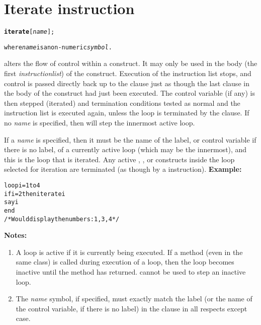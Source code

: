 \chapter{Iterate instruction}
\index{,}
\begin{shaded}
\begin{alltt}
\textbf{iterate} [\emph{name}];

where \emph{name} is a non-numeric \emph{symbol}.
\end{alltt}
\end{shaded}
  alters the flow of control within a 
construct.
It may only be used in the body (the first \emph{instructionlist})
of the construct.
 Execution of the instruction list stops, and control is passed
directly back up to the  clause just as though the last
clause in the body of the construct had just been executed.
The control variable (if any) is then stepped (iterated) and termination
conditions tested as normal and the instruction list is executed again,
unless the loop is terminated by the  clause.
 If no \emph{name} is specified, then  will step
the innermost active loop.
 
If a \emph{name} is specified, then it must be the name of the
label, or control variable if there is no label, of a currently active
loop (which may be the innermost), and this is the loop that is
iterated.
Any active , , or  constructs
inside the loop selected for iteration are terminated (as though by a
 instruction).
 \textbf{Example:}
\begin{alltt}
loop i=1 to 4
  if i=2 then iterate i
  say i
  end
/* Would display the numbers:  1, 3, 4  */
\end{alltt}
 \textbf{Notes:}
\begin{enumerate}
\item A loop is active if it is currently being executed.
If a method (even in the same class) is called during execution of a
loop, then the loop becomes inactive until the method has returned.
 cannot be used to step an inactive loop.
\item The \emph{name} symbol, if specified, must exactly match the
label (or the name of the control variable, if there is no label) in the
 clause in all respects except case.
\end{enumerate}
